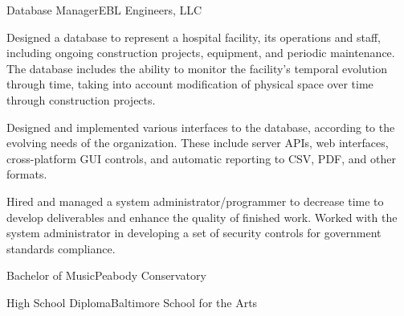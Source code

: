 \begin{jobs}
\begin{job}{Database Manager}{EBL Engineers, LLC}
{            Designed a database to represent a hospital facility, its
            operations and staff, including ongoing construction projects,
            equipment, and periodic maintenance. The database includes the
            ability to monitor the facility's temporal evolution through time,
            taking into account modification of physical space over time
            through construction projects.

            Designed and implemented various interfaces to the database,
            according to the evolving needs of the organization. These include
            server APIs, web interfaces, cross-platform GUI controls, and
            automatic reporting to CSV, PDF, and other formats.

            Hired and managed a system administrator/programmer to decrease
            time to develop deliverables and enhance the quality of finished
            work.  Worked with the system administrator in developing a set of
            security controls for government standards compliance.
        }
    \end{job}
\end{jobs}

\begin{education}
    \begin{degree}{Bachelor of Music}{Peabody Conservatory}
    \end{degree}

    \begin{degree}{High School Diploma}{Baltimore School for the Arts}
    \end{degree}
\end{education}
